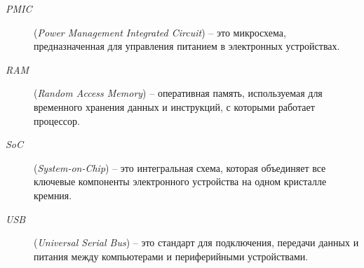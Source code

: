 \begin{description}
	\item[\normalfont \textit{PMIC}] (\textit{Power Management Integrated Circuit}) -- это микросхема, предназначенная для управления питанием в электронных устройствах.
	
	\item[\normalfont \textit{RAM}] (\textit{Random Access Memory}) -- оперативная память, используемая для временного хранения данных и инструкций, с которыми работает процессор.
	
	\item[\normalfont \textit{SoC}] (\textit{System-on-Chip}) -- это интегральная схема, которая объединяет все ключевые компоненты электронного устройства на одном кристалле кремния.
	
	\item[\normalfont \textit{USB}] (\textit{Universal Serial Bus}) -- это стандарт для подключения, передачи данных и питания между компьютерами и периферийными устройствами.
\end{description}


\newpage
